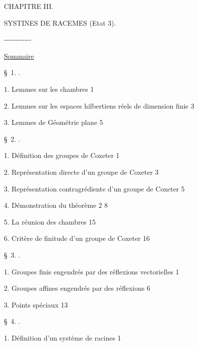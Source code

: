 \begin{center}CHAPITRE III.\end{center}

\begin{center}SYSTINES DE RACEMES (Etat 3).\end{center}

\begin{center}\mbox{-{}-{}-{}-{}-{}-{}-{}-{}-{}-{}-{}-}\end{center}

\begin{center}\uline{Sommaire}\end{center}

\begin{center}\S~1. .\end{center}

1. Lemmes sur les chambres \dotfill{} 1

2. Lemmes sur les espaces hilbertiens réels de dimension finie \dotfill{} 3

3. Lemmes de Géométrie plane \dotfill{} 5

\begin{center}\S~2. .\end{center}

1. Définition des groupes de Coxeter \dotfill{} 1

2. Représentation directe d’un groupe de Coxeter \dotfill{} 3

3. Représentation contragrédiente d’un groupe de Coxeter \dotfill{} 5

4. Démonstration du théorème 2 \dotfill{} 8

5. La réunion des chambres \dotfill{} 15

6. Critère de finitude d’un groupe de Coxeter \dotfill{} 16

\begin{center}\S~3. .\end{center}

1. Groupes finis engendrés par des réflexions vectorielles \dotfill{} 1

2. Groupes affines engendrés par des réflexions \dotfill{} 6

3. Points spéciaux \dotfill{} 13

\begin{center}\S~4. .\end{center}

1. Définition d’un système de racines \dotfill{} 1

